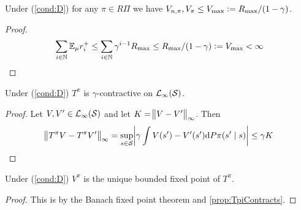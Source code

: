 \documentclass{article}
\begin{document}
\begin{prop}
  Under (\cref{cond:D}) for any $\pi \in R\Pi$ we have
  $V_{n,\pi}, V_\pi \leq V_{\max} \vcentcolon= R_{\max}/(1-\gamma)$.
\end{prop}
\begin{proof}
  \[ \sum_{i \in \mathbb{N}} \mathbb{E}_\mu r_i^+
    \leq \sum_{i \in \mathbb{N}} \gamma^{i-1} R_{\max}
  \leq R_{\max} / (1-\gamma) := V_{\max} < \infty \]
\end{proof}

\begin{prop}
  Under (\cref{cond:D})
  $T^\pi$ is $\gamma$-contractive on $\mathcal{L}_\infty(\mathcal{S})$.
  \label{prop:TpiContracts}
\end{prop}
\begin{proof}
  Let $V, V' \in \mathcal{L}_\infty(\mathcal{S})$
  and let $K = \norm{V - V'}_\infty$.
  Then
  \[ \norm{T^\pi V - T^\pi V'}_\infty
    = \sup_{s \in \mathcal{S}} \abs{ \gamma
    \int V(s') - V'(s') \mathrm{d} P\pi(s' \mid s)}
  \leq \gamma K \]
\end{proof}

\begin{cor}
  Under (\cref{cond:D})
  $V^\pi$ is the unique bounded fixed point of $T^\pi$.
\end{cor}
\begin{proof}
  This is by the Banach fixed point theorem and \cref{prop:TpiContracts}.
\end{proof}
\end{document}
